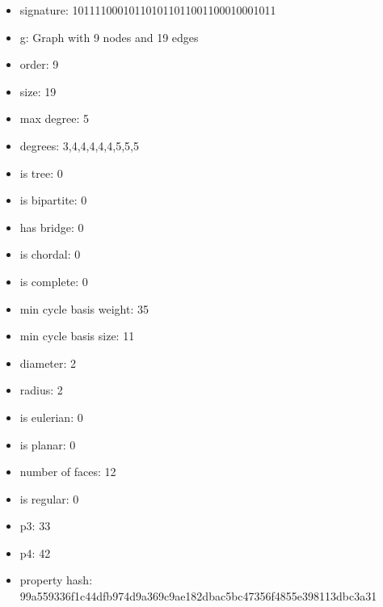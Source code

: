 \newpage
\begin{figure}
\end{figure}
\begin{itemize}
\item signature: 101111000101101011011001100010001011
\item g: Graph with 9 nodes and 19 edges
\item order: 9
\item size: 19
\item max degree: 5
\item degrees: 3,4,4,4,4,4,5,5,5
\item is tree: 0
\item is bipartite: 0
\item has bridge: 0
\item is chordal: 0
\item is complete: 0
\item min cycle basis weight: 35
\item min cycle basis size: 11
\item diameter: 2
\item radius: 2
\item is eulerian: 0
\item is planar: 0
\item number of faces: 12
\item is regular: 0
\item p3: 33
\item p4: 42
\item property hash: 99a559336f1c44dfb974d9a369c9ae182dbac5bc47356f4855e398113dbc3a31
\end{itemize}
